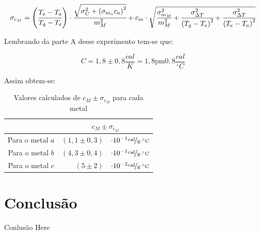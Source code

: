 \documentclass[a4paper]{article}
\providecommand{\tabularnewline}{\\}
\providecommand{\tabularnewline}{\\} %
\begin{document}
			\begin{equation}
				\sigma_{c_{M}}=\left(\cfrac{T_{e}-T_{a}}{T_{q}-T_{e}}\right)\cdot\cfrac{\sqrt{\sigma_{C}^{2}+\left(\sigma_{m_{a}}c_{a}\right)^{2}}}{m_{M}^{2}}+c_{m}\cdot\sqrt{\cfrac{\sigma_{m_{M}}^{2}}{m_{M}^{2}}+\cfrac{\sigma_{\Delta T}^{2}}{\left(T_{q}-T_{e}\right)^{2}}+\cfrac{\sigma_{\Delta T}^{2}}{\left(T_{e}-T_{a}\right)^{2}}}
			\end{equation}


			Lembrando da parte A desse experimento tem-se que:

			\begin{equation}
				C=1,8\pm0,8\unit{\frac{cal}{K}=1,8\pm0,8}\frac{cal}{^{\circ}C}
			\end{equation}


			Assim obtem-se:

			\begin{table}[!ht]
				\caption{Valores calculados de $c_{M}\pm\sigma_{c_{M}}$ para cada metal}

				\centering{}%
				\begin{tabular}{|c|rl|}
					\cline{2-3} 
					\multicolumn{1}{c|}{} & \multicolumn{2}{c|}{$c_{M}\pm\sigma_{c_{M}}$}\tabularnewline
					\hline 
					Para o metal $a$ & $\left(1,1\pm0,3\right)$ & $\cdot10^{-1}\unitfrac{cal}{g\cdot^{\circ}C}$\tabularnewline
					\hline 
					Para o metal $b$ & $\left(4,3\pm0,4\right)$ & $\cdot10^{-1}\unitfrac{cal}{g\cdot^{\circ}C}$\tabularnewline
					\hline 
					Para o metal $c$ & $\left(5\pm2\right)$ & $\cdot10^{-2}\unitfrac{cal}{g\cdot^{\circ}C}$\tabularnewline
					\hline 
				\end{tabular}
			\end{table}


	\section{Conclusão}

	Conlusão Here 
\end{document}
